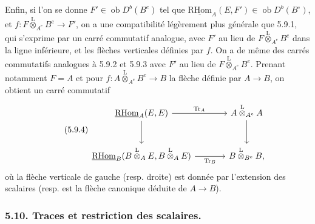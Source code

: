 \documentclass[11pt]{article}
\newcommand{\R}{\mathrm{R}}\newcommand{\RHomCore}{\mathrm{RHom}}
\newcommand{\ob}{\operatorname{ob}}
\providecommand{\RHom}{\RHomCore}
\providecommand{\uRHom}{\underline{\RHom}}
\providecommand{\Tr}{\operatorname{Tr}}
\providecommand{\Tr}{\operatorname{Tr}}
\providecommand{\lten}{\overset{\mathrm L}{\otimes}}
\providecommand{\Tr}{\operatorname{Tr}}
\providecommand{\RHom}{\RHomCore}
\providecommand{\ob}{\operatorname{ob}}
\providecommand{\lten}{\overset{\mathrm L}{\otimes}}
\providecommand{\RHom}{\R\mathcal{H}om}
\providecommand{\lten}{\overset{\mathrm L}{\otimes}}
\providecommand{\R}{\mathrm R}
\providecommand{\Tr}{\operatorname{Tr}}
\providecommand{\lten}{\overset{\mathrm L}{\otimes}}
\providecommand{\lten}{\overset{\mathrm L}{\otimes}}
\providecommand{\lten}{\overset{\mathrm L}{\otimes}}
\providecommand{\RHom}{\RHomCore}
\providecommand{\Tr}{\operatorname{Tr}}
\providecommand{\lten}{\overset{\mathrm L}{\otimes}}
\begin{document}
Enfin, si l'on se donne $F'\in\ob D^b(B^e)$ tel que $\uRHom_A(E,F')\in\ob D^b(B^\circ)$, et $f:F\lten_{A^e}B^e\to F'$, on a une compatibilité légèrement plus générale que 5.9.1, qui s'exprime par un carré commutatif analogue, avec $F'$ au lieu de $F\lten_{A^e}B^e$ dans la ligne inférieure, et les flèches verticales définies par $f$. On a de même des carrés commutatifs analogues à 5.9.2 et 5.9.3 avec $F'$ au lieu de $F\lten_{A^e}B^e$. Prenant notamment $F=A$ et pour $f:A\lten_{A^e}B^e\to B$ la flèche définie par $A\to B$, on obtient un carré commutatif
\begin{equation}\tag{5.9.4}
\begin{tikzcd}[column sep=large,row sep=large]
\uRHom_A(E,E) \arrow[r,"\Tr_A"] \arrow[d] & A\lten_{A^e}A \arrow[d]\\
\uRHom_B(B\lten_AE,B\lten_AE) \arrow[r,"\Tr_B"'] & B\lten_{B^e}B,
\end{tikzcd}
\end{equation}
où la flèche verticale de gauche (resp. droite) est donnée par l'extension des scalaires (resp. est la flèche canonique déduite de $A\to B$).

\subsubsection*{5.10. Traces et restriction des scalaires.}
\end{document}
